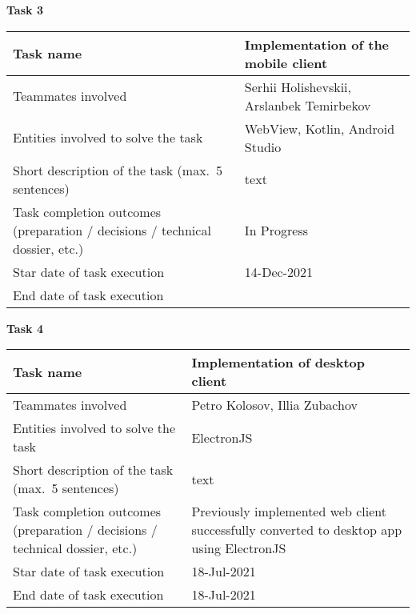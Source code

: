 \vskip 5mm
\hspace*{-6mm}\textbf{Task 3}\\[2mm]
\begin{tabular}{|p{}|p{}|}
    \hline
    Task name                                                                   & Implementation of the mobile client       \\
    \hline
    Teammates involved                                                          & Serhii Holishevskii, Arslanbek Temirbekov \\
    \hline
    Entities involved to solve the task                                         & WebView, Kotlin, Android Studio           \\
    \hline
    Short description of the task (max.\ 5 sentences)                            & text                               \\
    \hline
    Task completion outcomes  (preparation / decisions / technical dossier, etc.) & In Progress                               \\
    \hline
    Star date of task execution                                                 & 14-Dec-2021                               \\
    \hline
    End date of task execution                                                  &                                           \\
    \hline
\end{tabular}
\vskip 5mm
\hspace*{-6mm}\textbf{Task 4}\\[2mm]
\begin{tabular}{|p{}|p{}|}
    \hline
    Task name                           & Implementation of desktop client \\
    \hline
    Teammates involved                  & Petro Kolosov, Illia Zubachov    \\
    \hline
    Entities involved to solve the task & ElectronJS                       \\
    \hline
    Short description of the task (max.\ 5 sentences)                            & text                               \\
    \hline
    Task completion outcomes (preparation / decisions / technical dossier, etc.) & Previously implemented web client successfully converted to
    desktop app using ElectronJS \\
    \hline
    Star date of task execution         & 18-Jul-2021                      \\
    \hline
    End date of task execution          & 18-Jul-2021                      \\
    \hline
\end{tabular}
